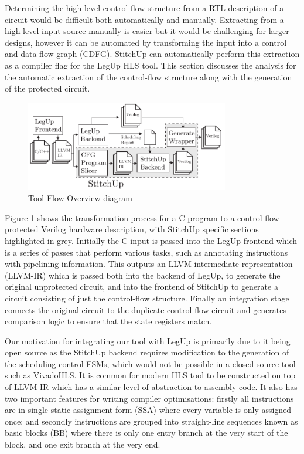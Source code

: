 Determining the high-level control-flow structure from a RTL description
of a circuit would be difficult both automatically and manually.
Extracting from a high level input source manually is easier but it would
be challenging for larger designs, however it can be automated by
transforming the input into a control and data flow graph (CDFG).
StitchUp can automatically perform this extraction as a compiler flag
for the LegUp HLS tool.
This section discusses the analysis for the automatic extraction of the
control-flow structure along with the generation of the protected circuit. 

\begin{figure}[t]
\centering
\includegraphics[width=3.5in]{./imgs/tool-flow.pdf}
\caption{Tool Flow Overview diagram}
\label{fig:tool_flow_diagram}
\end{figure}

Figure \ref{fig:tool_flow_diagram} shows the transformation process for a C program
to a control-flow protected
Verilog hardware description, with StitchUp specific sections highlighted in grey.
Initially the C input is passed into the LegUp frontend which is
a series of passes that
perform various tasks, such as annotating instructions with pipelining information.
This outputs an LLVM intermediate representation (LLVM-IR) which is passed both into the backend of LegUp,
to generate the
original unprotected circuit, and into the frontend of StitchUp to generate a circuit
consisting of just the control-flow structure.
Finally an integration stage connects the original circuit to the duplicate control-flow circuit
and generates comparison logic to ensure that the state registers match.

Our motivation for integrating our tool with LegUp is primarily due to it being open source as
the StitchUp backend requires modification to the generation of the scheduling control FSMs,
which would not be possible in a closed source tool such as VivadoHLS.
It is common for modern HLS tool to be constructed on top of LLVM-IR which has
a similar level of abstraction to assembly code.
It also has two important features for writing compiler optimisations:
firstly all instructions are in single static assignment form (SSA) where every variable is only
assigned once; and secondly instructions are grouped into straight-line sequences known as basic blocks (BB)
where there is only one entry branch at the very start of the block, and one exit branch at the very end.

